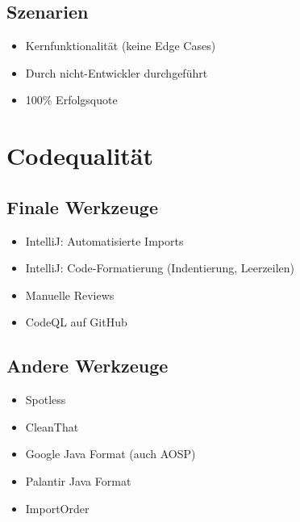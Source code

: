\documentclass{sdqbeamer}
\begin{document}
\subsection{Szenarien}
\begin{frame}{\insertsubsectionhead}
    \begin{itemize}
        \item Kernfunktionalität (keine Edge Cases)
        \item Durch nicht-Entwickler durchgeführt
        \item 100\% Erfolgsquote
    \end{itemize}
\end{frame}



\section{Codequalität}

\subsection{Finale Werkzeuge}
\begin{frame}{\insertsubsectionhead}
    \begin{itemize}
        \item IntelliJ: Automatisierte Imports
        \item IntelliJ: Code-Formatierung (Indentierung, Leerzeilen)
        \item Manuelle Reviews
        \item CodeQL auf GitHub
    \end{itemize}
\end{frame}

\subsection{Andere Werkzeuge}
\begin{frame}{\insertsubsectionhead}
    \begin{itemize}
        \item Spotless
        \item CleanThat
        \item Google Java Format (auch AOSP)
        \item Palantir Java Format
        \item ImportOrder
    \end{itemize}
\end{frame}
\end{document}
